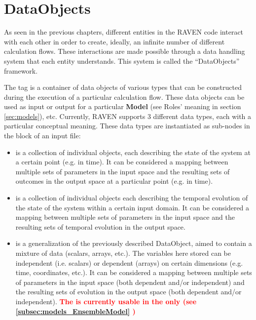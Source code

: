 \section{DataObjects}
\label{sec:DataObjects}

As seen in the previous chapters, different entities in the RAVEN
code interact with each other in order to create, ideally, an infinite number of
different calculation flows.
%
These interactions are made possible through a data handling system that each
entity understands.
%
This system is called the ``DataObjects'' framework.

The  tag is a container of data objects of various types that can
be constructed during the execution of a particular calculation flow.
%
These data objects can be used as input or output for a particular
\textbf{Model} (see Roles' meaning in section \ref{sec:models}), etc.
%
Currently, RAVEN supports 3 different data types, each with a particular
conceptual meaning.
%
These data types are instantiated as sub-nodes in the  block of
an input file:
\begin{itemize}
  \item {} is a collection of individual objects, each
  describing the state of the system at a certain point (e.g. in time).
  It can be considered a mapping between multiple sets of parameters in the
  input space and the resulting sets of outcomes in the output space at a
  particular point (e.g. in time).
  \item {} is a collection of individual objects each
  describing the temporal evolution of the state of the system within a certain
  input domain.
  It can be considered a mapping between multiple sets of parameters in the
  input space and the resulting sets of temporal evolution in the output
  space.
   \item {} is a generalization of the previously described DataObject,
   aimed to contain a mixture of data (scalars, arrays, etc.). The variables here stored
   can be independent (i.e. scalars) or dependent (arrays) on certain dimensions (e.g. time, coordinates, etc.).
  It can be considered a mapping between multiple sets of parameters in the
  input space (both dependent and/or independent) and the resulting sets of evolution in the output
  space (both dependent and/or independent).
  \nb \textcolor{red} {\textbf{The   is currently usable in the   only (see \ref{subsec:models_EnsembleModel} )}}
\end{itemize}

